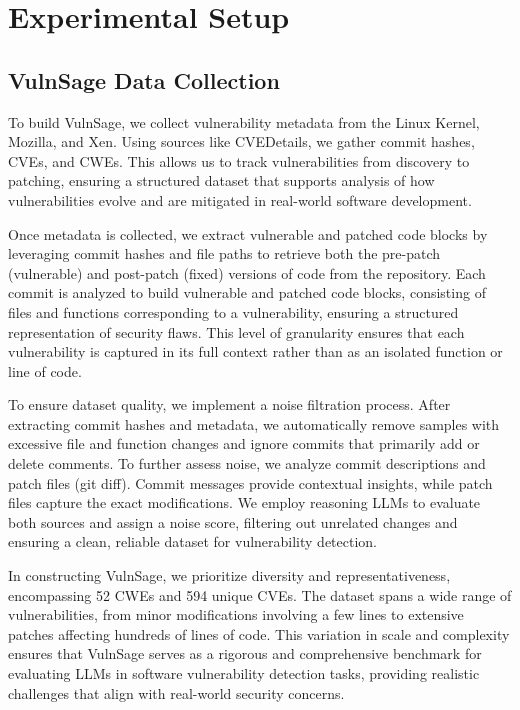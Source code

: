 \documentclass[sigconf,review,anonymous]{acmart}
\begin{document}
\section{Experimental Setup}
\label{section: Experimental Setup}

\subsection{VulnSage Data Collection}
\label{subsection:dataset}
To build VulnSage, we collect vulnerability metadata from the Linux Kernel, Mozilla, and Xen. Using sources like CVEDetails, we gather commit hashes, CVEs, and CWEs. This allows us to track vulnerabilities from discovery to patching, ensuring a structured dataset that supports analysis of how vulnerabilities evolve and are mitigated in real-world software development.

Once metadata is collected, we extract vulnerable and patched code blocks by leveraging commit hashes and file paths to retrieve both the pre-patch (vulnerable) and post-patch (fixed) versions of code from the repository. Each commit is analyzed to build vulnerable and patched code blocks, consisting of files and functions corresponding to a vulnerability, ensuring a structured representation of security flaws. This level of granularity ensures that each vulnerability is captured in its full context rather than as an isolated function or line of code.

To ensure dataset quality, we implement a noise filtration process. After extracting commit hashes and metadata, we automatically remove samples with excessive file and function changes and ignore commits that primarily add or delete comments. To further assess noise, we analyze commit descriptions and patch files (git diff). Commit messages provide contextual insights, while patch files capture the exact modifications. We employ reasoning LLMs to evaluate both sources and assign a noise score, filtering out unrelated changes and ensuring a clean, reliable dataset for vulnerability detection.

In constructing VulnSage, we prioritize diversity and representativeness, encompassing 52 CWEs and 594 unique CVEs. The dataset spans a wide range of vulnerabilities, from minor modifications involving a few lines to extensive patches affecting hundreds of lines of code. This variation in scale and complexity ensures that VulnSage serves as a rigorous and comprehensive benchmark for evaluating LLMs in software vulnerability detection tasks, providing realistic challenges that align with real-world security concerns. 
\end{document}

